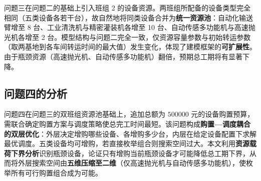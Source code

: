 \documentclass[12pt,a4paper]{ctexart}
\begin{document}
问题三在问题二的基础上引入班组 2 的设备资源。两班组所配备的设备类型完全相同（五类设备各若干台），故自然地将同类设备合并为\textbf{统一资源池}：自动化输送臂增至 8 台、工业清洗机与精密灌装机各增至 10 台、自动传感多功能机与高速抛光机各增至 2 台。模型结构与问题二完全一致，仅资源容量参数与初始转运参数（取两基地到各车间转运时间的最大值）发生变化，体现了建模框架的\textbf{可扩展性}。由于瓶颈资源（高速抛光机、自动传感多功能机）翻倍，预期总工期将有显著下降。

\subsection{问题四的分析}

问题四在问题三的双班组资源池基础上，追加总额为 $500000$ 元的设备购置预算，需联合确定购置方案与调度策略使总完工时间最短。该问题构成\textbf{购置—调度耦合的双层优化}：外层决定增购哪些设备、各增购多少台，内层在给定设备配置下求解最优调度。五类设备均可增购，若直接枚举组合则搜索空间过大。本文利用\textbf{资源载荷下界分析}识别瓶颈设备，论证只有增购当前瓶颈设备才可能降低总工期下界，从而将外层搜索空间由\textbf{五维压缩至二维}（仅高速抛光机与自动传感多功能机），使枚举所有可行购置组合成为可能。

\end{document}
